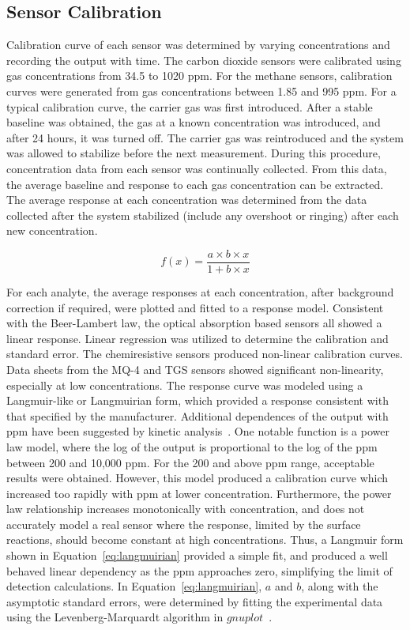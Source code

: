 \documentclass[times]{joehreview}
\begin{document}
	\subsection{Sensor Calibration}
	\label{sec:method_cal}
	Calibration curve of each sensor was determined by varying concentrations and recording the output with time.  The carbon dioxide sensors were calibrated using gas concentrations from 34.5 to 1020 ppm.  For the methane sensors, calibration curves were generated from gas concentrations between 1.85 and 995 ppm.   For a typical calibration curve, the carrier gas was first introduced.  After a stable baseline was obtained, the gas at a known concentration was introduced, and after 24 hours, it was turned off. The carrier gas was reintroduced and the system was allowed to stabilize before the next measurement. During this procedure, concentration data from each sensor was continually collected. From this data, the average baseline and response to each gas concentration can be extracted.  The average response at each concentration was determined from the data collected after the system stabilized (include any overshoot or ringing) after each new concentration.
	
	\begin{equation}
	\label{eq:langmuirian}
	f(x)=\frac{a\times b\times x}{1+b\times x}
	\end{equation}
	
	For each analyte, the average responses at each concentration, after background correction if required, were plotted and fitted to a response model.  Consistent with the Beer-Lambert law, the optical absorption based sensors all showed a linear response.  Linear regression was utilized to determine the calibration and standard error.  The chemiresistive sensors produced non-linear calibration curves.  Data sheets from the MQ-4 and TGS sensors showed significant non-linearity, especially at low concentrations.  The response curve was modeled using a Langmuir-like or Langmuirian form, which provided a response consistent with that specified by the manufacturer.  Additional dependences of the output with ppm have been suggested by kinetic analysis~\cite{barsan_fundamental_1999,ahlers_rate_2005}.  One notable function is a power law model, where the log of the output is proportional to the log of the ppm between 200 and 10,000 ppm.  For the 200 and above ppm range, acceptable results were obtained.  However, this model produced a calibration curve which increased too rapidly with ppm at lower concentration.  Furthermore, the power law relationship increases monotonically with concentration, and does not accurately model a real sensor where the response, limited by the surface reactions, should become constant at high concentrations.  Thus, a Langmuir form shown in Equation~\ref{eq:langmuirian} provided a simple fit, and produced a well behaved linear dependency as the ppm approaches zero, simplifying the limit of detection calculations.  In Equation~\ref{eq:langmuirian}, $a$ and $b$, along with the asymptotic standard errors, were determined by fitting the experimental data using the Levenberg-Marquardt algorithm in $gnuplot$~\cite{williams_gnuplot_2016}.
	
\end{document}
